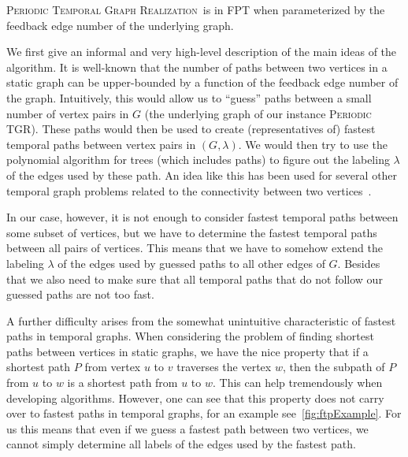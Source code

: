 \documentclass[a4paper,UKenglish,cleveref, autoref, thm-restate]{lipics-v2021}
\newcommand{\ie}{i.\,e.,\ }
\newcommand{\deltaExactLong}{\textsc{Periodic Temporal Graph Realization}}
\newcommand{\deltaExact}{\textsc{Periodic TGR}}
\begin{document}
\begin{theorem}\label{thm:FPTwrtFES}
    \deltaExactLong\ is in FPT when parameterized by the feedback edge number of the underlying graph.
\end{theorem}

We first give an informal and very high-level description of the main ideas of the algorithm. It is well-known that the number of paths between two vertices in a static graph can be upper-bounded by a function of the feedback edge number of the graph. Intuitively, this would allow us to ``guess'' paths between a small number of vertex pairs in $G$ (the underlying graph of our instance \deltaExact). These paths would then be used to create (representatives of) fastest temporal paths between vertex pairs in $(G,\lambda)$. We would then try to use the polynomial algorithm for trees (which includes paths) to figure out the labeling $\lambda$ of the edges used by these path. An idea like this has been used for several other temporal graph problems related to the connectivity between two vertices~\cite{casteigts2021finding,FMNR22a,EMM22}.

In our case, however, it is not enough to consider fastest temporal paths between some subset of vertices, but we have to determine the fastest temporal paths between all pairs of vertices. This means that we have to somehow extend the labeling $\lambda$ of the edges used by guessed paths to all other edges of $G$.
Besides that we also need to make sure that all temporal paths that do not follow our guessed paths are not too fast. 

	A further difficulty arises from the somewhat unintuitive characteristic of fastest paths in temporal graphs.
 When considering the problem of finding shortest paths between vertices in static graphs, we have the nice property that if a shortest path $P$ from vertex $u$ to $v$ traverses the vertex $w$,
	then the subpath of $P$ from $u$ to $w$ is a shortest path from $u$ to $w$. This can help tremendously when developing algorithms.
	However, one can see that this property does not carry over to fastest paths in temporal graphs, for an example see~\cref{fig:ftpExample}.
 For us this means that even if we guess a fastest path between two vertices, we cannot simply determine all labels of the edges used by the fastest path.
	
\end{document}
